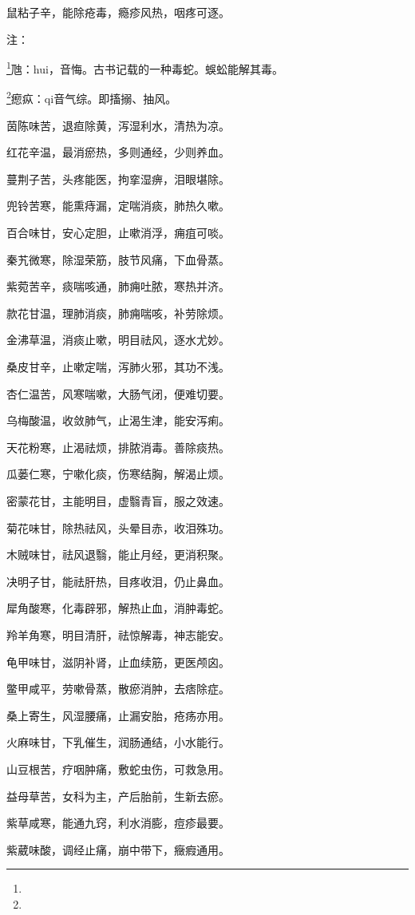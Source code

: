 \documentclass[a4paper,12pt,UTF8,twoside]{ctexbook}
\begin{document}
鼠粘子辛，能除疮毒，瘾疹风热，咽疼可逐。

注：

\footnote{}虺：hui，音悔。古书记载的一种毒蛇。蜈蚣能解其毒。

\footnote{}瘛疭：qi音气综。即搐搦、抽风。

茵陈味苦，退疸除黄，泻湿利水，清热为凉。

红花辛温，最消瘀热，多则通经，少则养血。

蔓荆子苦，头疼能医，拘挛湿痹，泪眼堪除。

兜铃苦寒，能熏痔漏，定喘消痰，肺热久嗽。

百合味甘，安心定胆，止嗽消浮，痈疽可啖。

秦艽微寒，除湿荣筋，肢节风痛，下血骨蒸。

紫菀苦辛，痰喘咳通，肺痈吐脓，寒热并济。

款花甘温，理肺消痰，肺痈喘咳，补劳除烦。

金沸草温，消痰止嗽，明目祛风，逐水尤妙。

桑皮甘辛，止嗽定喘，泻肺火邪，其功不浅。

杏仁温苦，风寒喘嗽，大肠气闭，便难切要。

乌梅酸温，收敛肺气，止渴生津，能安泻痢。

天花粉寒，止渴祛烦，排脓消毒。善除痰热。

瓜蒌仁寒，宁嗽化痰，伤寒结胸，解渴止烦。

密蒙花甘，主能明目，虚翳青盲，服之效速。

菊花味甘，除热祛风，头晕目赤，收泪殊功。

木贼味甘，祛风退翳，能止月经，更消积聚。

决明子甘，能祛肝热，目疼收泪，仍止鼻血。

犀角酸寒，化毒辟邪，解热止血，消肿毒蛇。

羚羊角寒，明目清肝，祛惊解毒，神志能安。

龟甲味甘，滋阴补肾，止血续筋，更医颅囟。

鳖甲咸平，劳嗽骨蒸，散瘀消肿，去痞除症。

桑上寄生，风湿腰痛，止漏安胎，疮疡亦用。

火麻味甘，下乳催生，润肠通结，小水能行。

山豆根苦，疗咽肿痛，敷蛇虫伤，可救急用。

益母草苦，女科为主，产后胎前，生新去瘀。

紫草咸寒，能通九窍，利水消膨，痘疹最要。

紫葳味酸，调经止痛，崩中带下，癥瘕通用。
\end{document}
